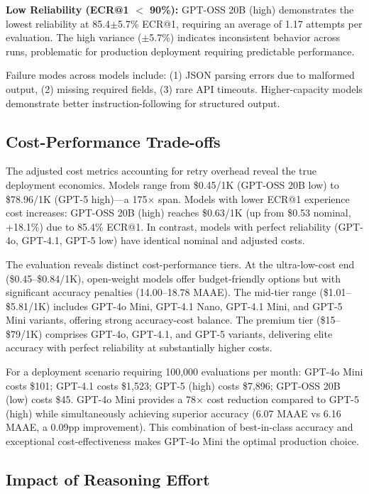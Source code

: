 \documentclass[letterpaper]{article} %
\begin{document}
\textbf{Low Reliability (ECR@1 $<$ 90\%):} GPT-OSS 20B (high) demonstrates the lowest reliability at 85.4$\pm$5.7\% ECR@1, requiring an average of 1.17 attempts per evaluation. The high variance ($\pm$5.7\%) indicates inconsistent behavior across runs, problematic for production deployment requiring predictable performance.

Failure modes across models include: (1) JSON parsing errors due to malformed output, (2) missing required fields, (3) rare API timeouts. Higher-capacity models demonstrate better instruction-following for structured output.

\subsection{Cost-Performance Trade-offs}

The adjusted cost metrics accounting for retry overhead reveal the true deployment economics. Models range from \$0.45/1K (GPT-OSS 20B low) to \$78.96/1K (GPT-5 high)---a 175$\times$ span. Models with lower ECR@1 experience cost increases: GPT-OSS 20B (high) reaches \$0.63/1K (up from \$0.53 nominal, +18.1\%) due to 85.4\% ECR@1. In contrast, models with perfect reliability (GPT-4o, GPT-4.1, GPT-5 low) have identical nominal and adjusted costs.

The evaluation reveals distinct cost-performance tiers. At the ultra-low-cost end (\$0.45--\$0.84/1K), open-weight models offer budget-friendly options but with significant accuracy penalties (14.00--18.78 MAAE). The mid-tier range (\$1.01--\$5.81/1K) includes GPT-4o Mini, GPT-4.1 Nano, GPT-4.1 Mini, and GPT-5 Mini variants, offering strong accuracy-cost balance. The premium tier (\$15--\$79/1K) comprises GPT-4o, GPT-4.1, and GPT-5 variants, delivering elite accuracy with perfect reliability at substantially higher costs.

For a deployment scenario requiring 100,000 evaluations per month: GPT-4o Mini costs \$101; GPT-4.1 costs \$1,523; GPT-5 (high) costs \$7,896; GPT-OSS 20B (low) costs \$45. GPT-4o Mini provides a 78$\times$ cost reduction compared to GPT-5 (high) while simultaneously achieving superior accuracy (6.07 MAAE vs 6.16 MAAE, a 0.09pp improvement). This combination of best-in-class accuracy and exceptional cost-effectiveness makes GPT-4o Mini the optimal production choice.

\subsection{Impact of Reasoning Effort}
\end{document}
